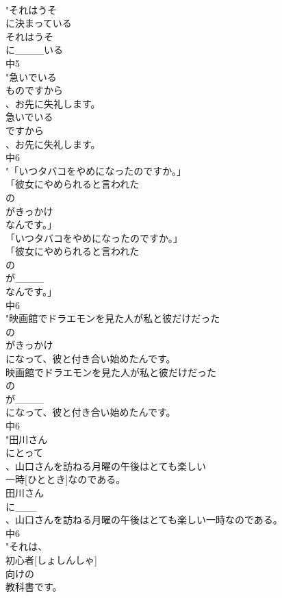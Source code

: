 \documentclass[8pt]{extreport}
\begin{document}
\begin{CJK}{UTF8}{min}
\\	"それはうそ
\\	に決まっている
\\	それはうそ
\\	に____いる
\\	中5
\\	"急いでいる
\\	ものですから
\\	、お先に失礼します。
\\	急いでいる
\\	ですから
\\	、お先に失礼します。
\\	中6
\\	"「いつタバコをやめになったのですか。」
\\	「彼女にやめられると言われた
\\	の
\\	がきっかけ
\\	なんです。」
\\	「いつタバコをやめになったのですか。」
\\	「彼女にやめられると言われた
\\	の
\\	が____
\\	なんです。」
\\	中6
\\	"映画館でドラエモンを見た人が私と彼だけだった
\\	の
\\	がきっかけ
\\	になって、彼と付き合い始めたんです。
\\	映画館でドラエモンを見た人が私と彼だけだった
\\	の
\\	が____
\\	になって、彼と付き合い始めたんです。
\\	中6
\\	"田川さん
\\	にとって
\\	、山口さんを訪ねる月曜の午後はとても楽しい
\\	一時[ひととき]なのである。
\\	田川さん
\\	に___
\\	、山口さんを訪ねる月曜の午後はとても楽しい一時なのである。
\\	中6
\\	"それは、
\\	初心者[しょしんしゃ]
\\	向けの
\\	教科書です。

\end{CJK}
\end{document}
